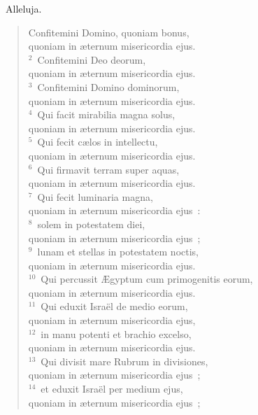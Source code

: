 ~\lettrine[lines=10,image=true,loversize=0.05,lraise=-0.03]{A}{}lleluja. \begin{flushleft}\begin{verse}\vspace{6pt}Confitemini Domino, quoniam bonus,\\ quoniam in \ae ternum misericordia ejus.\\
${}^{2}$~Confitemini Deo deorum,\\ quoniam in \ae ternum misericordia ejus.\\
${}^{3}$~Confitemini Domino dominorum,\\ quoniam in \ae ternum misericordia ejus.\\
${}^{4}$~Qui facit mirabilia magna solus,\\ quoniam in \ae ternum misericordia ejus.\\
${}^{5}$~Qui fecit c\ae los in intellectu,\\ quoniam in \ae ternum misericordia ejus.\\
${}^{6}$~Qui firmavit terram super aquas,\\ quoniam in \ae ternum misericordia ejus.\\
${}^{7}$~Qui fecit luminaria magna,\\ quoniam in \ae ternum misericordia ejus~:\\
${}^{8}$~solem in potestatem diei,\\ quoniam in \ae ternum misericordia ejus~;\\
${}^{9}$~lunam et stellas in potestatem noctis,\\ quoniam in \ae ternum misericordia ejus.\\
${}^{10}$~Qui percussit \AE gyptum cum primogenitis eorum,\\ quoniam in \ae ternum misericordia ejus.\\
${}^{11}$~Qui eduxit Isra\"el de medio eorum,\\ quoniam in \ae ternum misericordia ejus,\\
${}^{12}$~in manu potenti et brachio excelso,\\ quoniam in \ae ternum misericordia ejus.\\
${}^{13}$~Qui divisit mare Rubrum in divisiones,\\ quoniam in \ae ternum misericordia ejus~;\\
${}^{14}$~et eduxit Isra\"el per medium ejus,\\ quoniam in \ae ternum misericordia ejus~;\\

\end{verse}
\end{flushleft}
